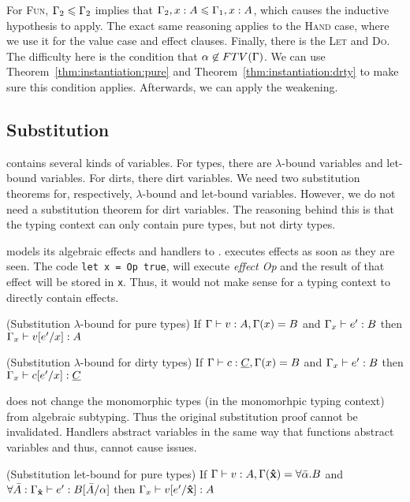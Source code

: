 For \textsc{Fun}, $\Gamma_2 \leqslant \Gamma_2$ implies that $\Gamma_2, x \mathrel{:} A \leqslant \Gamma_1, x \mathrel{:} A$, which causes the inductive hypothesis to apply. The exact same reasoning applies to the \textsc{Hand} case, where we use it for the value case and effect clauses. Finally, there is the \textsc{Let} and \textsc{Do}. The difficulty here is the condition that $\alpha \not\in FTV(\Gamma)$. We can use Theorem~\ref{thm:instantiation:pure} and Theorem~\ref{thm:instantiation:drty} to make sure this condition applies. Afterwards, we can apply the weakening. 

\subsection{Substitution}
\core contains several kinds of variables. For types, there are $\lambda$-bound variables and let-bound variables. For dirts, there dirt variables. We need two substitution theorems for, respectively, $\lambda$-bound and let-bound variables. However, we do not need a substitution theorem for dirt variables. The reasoning behind this is that the typing context can only contain pure types, but not dirty types. 

\core models its algebraic effects and handlers to \eff. \eff executes effects as soon as they are seen. The code \lstinline{let x = Op true}, will execute \textit{effect Op} and the result of that effect will be stored in \lstinline{x}. Thus, it would not make sense for a typing context to directly contain effects.

\begin{theorem}
\label{thm:sub:lambda:pure}
(Substitution $\lambda$-bound for pure types) If $\Gamma \vdash v \mathrel{:} A, \Gamma(x) = B$ and $\Gamma_x \vdash e' \mathrel{:} B$ then $\Gamma_x \vdash v[e'/x] \mathrel{:} A$
\end{theorem}

\begin{theorem}
\label{thm:sub:lambda:drty}
(Substitution $\lambda$-bound for dirty types) If $\Gamma \vdash c \mathrel{:} \underline{C}, \Gamma(x) = B$ and $\Gamma_x \vdash e' \mathrel{:} B$ then $\Gamma_x \vdash c[e'/x] \mathrel{:} \underline{C}$
\end{theorem}
\core does not change the monomorphic types (in the monomorhpic typing context) from algebraic subtyping. Thus the original substitution proof cannot be invalidated. Handlers abstract variables in the same way that functions abstract variables and thus, cannot cause issues.


\begin{theorem}
\label{thm:sub:let:pure}
(Substitution let-bound for pure types) If $\Gamma \vdash v \mathrel{:} A, \Gamma(\textbf{\^{x}}) = \forall \bar{\alpha} . B$ and $\forall \bar{A}: \Gamma_{\textbf{\^{x}}} \vdash e' \mathrel{:} B[\bar{A}/\alpha]$ then $\Gamma_x \vdash v[e'/\textbf{\^{x}}] \mathrel{:} A$
\end{theorem}

